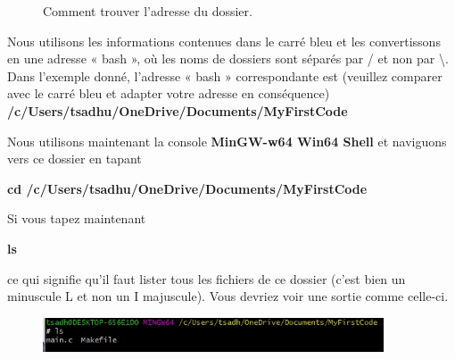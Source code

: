 \documentclass{article}
\begin{document}
\begin{figure}[H]
\begin{subfigure}[c]{0.5\textwidth}
\end{subfigure}
\caption{Comment trouver l'adresse du dossier.\label{F:FindFolderAddress}}
\end{figure}
Nous utilisons les informations contenues dans le carré bleu et les convertissons en une adresse « bash », où les noms de dossiers sont séparés par / et non par \textbackslash. Dans l'exemple donné, l'adresse « bash » correspondante est (veuillez comparer avec le carré bleu et adapter votre adresse en conséquence) \textbf{/c/Users/tsadhu/OneDrive/Documents/MyFirstCode}

Nous utilisons maintenant la console {\color{MidnightBlue}\textbf{MinGW-w64 Win64 Shell}} et naviguons vers ce dossier en tapant
\begin{tcolorbox}[width=\textwidth,colframe=MidnightBlue,colback={black},title={Ceci est la console MinGW-w64 Win64 Shell},outer arc=0mm,colupper=white]    
      \large\textbf{cd /c/Users/tsadhu/OneDrive/Documents/MyFirstCode}
\end{tcolorbox}
Si vous tapez maintenant 
\begin{tcolorbox}[width=\textwidth,colframe=MidnightBlue,colback={black},title={Ceci est la console MinGW-w64 Win64 Shell},outer arc=0mm,colupper=white]    
      \large\textbf{ls}
\end{tcolorbox}
ce qui signifie qu'il faut lister tous les fichiers de ce dossier (c'est bien un minuscule L et non un I majuscule). Vous devriez voir une sortie comme celle-ci.
\begin{figure}[H]
\center
\includegraphics[width=0.9\textwidth]{Plots/FirstCode_5.jpeg}
\end{figure}
\end{document}
